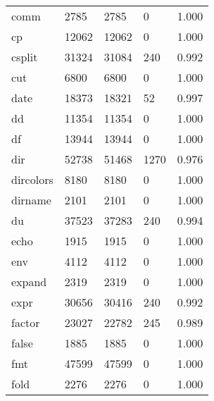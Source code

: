 \begin{longtable}{lp{4.5cm}p{4.5cm}p{4.5cm}p{4.5cm}}
comm      &                     2785 &         2785 &             0 &                    1.000 \\
cp        &                    12062 &        12062 &             0 &                    1.000 \\
csplit    &                    31324 &        31084 &           240 &                    0.992 \\
cut       &                     6800 &         6800 &             0 &                    1.000 \\
date      &                    18373 &        18321 &            52 &                    0.997 \\
dd        &                    11354 &        11354 &             0 &                    1.000 \\
df        &                    13944 &        13944 &             0 &                    1.000 \\
dir       &                    52738 &        51468 &          1270 &                    0.976 \\
dircolors &                     8180 &         8180 &             0 &                    1.000 \\
dirname   &                     2101 &         2101 &             0 &                    1.000 \\
du        &                    37523 &        37283 &           240 &                    0.994 \\
echo      &                     1915 &         1915 &             0 &                    1.000 \\
env       &                     4112 &         4112 &             0 &                    1.000 \\
expand    &                     2319 &         2319 &             0 &                    1.000 \\
expr      &                    30656 &        30416 &           240 &                    0.992 \\
factor    &                    23027 &        22782 &           245 &                    0.989 \\
false     &                     1885 &         1885 &             0 &                    1.000 \\
fmt       &                    47599 &        47599 &             0 &                    1.000 \\
fold      &                     2276 &         2276 &             0 &                    1.000 \\

\end{longtable}
